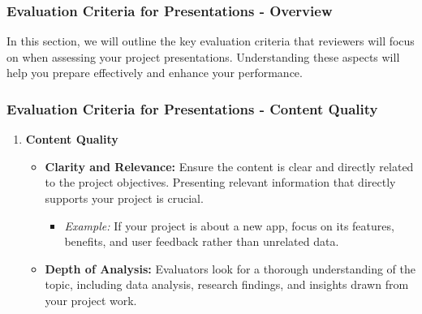 \documentclass[aspectratio=169]{beamer}
\begin{document}
\begin{frame}[fragile]
    \frametitle{Evaluation Criteria for Presentations - Overview}
    In this section, we will outline the key evaluation criteria that reviewers will focus on when assessing your project presentations. Understanding these aspects will help you prepare effectively and enhance your performance.
\end{frame}

\begin{frame}[fragile]
    \frametitle{Evaluation Criteria for Presentations - Content Quality}
    \begin{enumerate}
        \item \textbf{Content Quality}
        \begin{itemize}
            \item \textbf{Clarity and Relevance:} Ensure the content is clear and directly related to the project objectives. Presenting relevant information that directly supports your project is crucial.
            \begin{itemize}
                \item \textit{Example:} If your project is about a new app, focus on its features, benefits, and user feedback rather than unrelated data.
            \end{itemize}
            \item \textbf{Depth of Analysis:} Evaluators look for a thorough understanding of the topic, including data analysis, research findings, and insights drawn from your project work.
        \end{itemize}
    \end{enumerate}
\end{frame}
\end{document}
